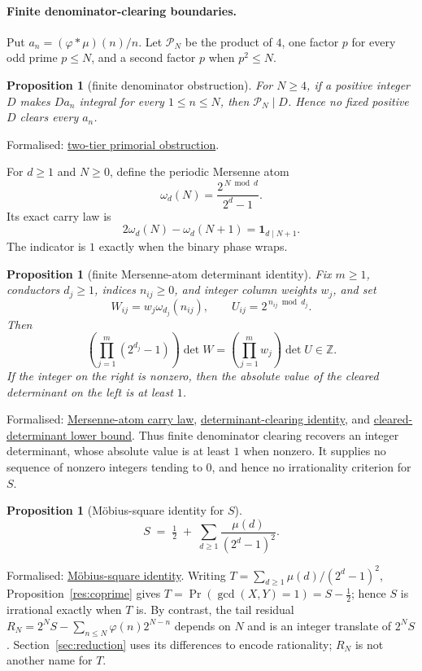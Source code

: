 \documentclass[11pt]{article}
\newcommand{\commit}{ebc98ee71f6819bd9fe344a0bb343542c604e533}
\newcommand{\repobase}{https://github.com/wcook04/plectis-lean-erdos249-257/blob/\commit}
\newcommand{\PK}{Erdos249257}
\newcommand{\lword}[4]{\href{\repobase/\PK/#1\#L#2}{#4}}
\newtheorem{proposition}[theorem]{Proposition}
\theoremstyle{definition}
\theoremstyle{remark}
\newcommand{\Z}{\mathbb{Z}}
\newcommand{\ph}{\varphi}
\begin{document}
{\paragraph{Finite denominator-clearing boundaries.}\label{sec:primitiveindex}
Put \(a_n=(\ph*\mu)(n)/n\).  Let $\mathcal P_N$ be the product of $4$, one factor
$p$ for every odd prime $p\le N$, and a second factor $p$ when $p^2\le N$.
\begin{proposition}[finite denominator obstruction]
\label{res:primitiveindex}
For $N\ge4$, if a positive integer $D$ makes $Da_n$ integral for every
$1\le n\le N$, then $\mathcal P_N\mid D$.  Hence no fixed positive $D$ clears every
$a_n$.
\end{proposition}
\noindent Formalised:
\lword{PrimitiveDeterminantLift.lean}{148}{twoTierPrimorial_dvd_of_integral_jet}{two-tier primorial obstruction}.

For \(d\ge1\) and $N\ge0$, define the periodic Mersenne atom
\[
 \omega_d(N)=\frac{2^{\,N\bmod d}}{2^d-1}.
\]
Its exact carry law is
\[
 2\omega_d(N)-\omega_d(N+1)=\mathbf1_{d\mid N+1}.
\]
The indicator is \(1\) exactly when the binary phase wraps.

\begin{proposition}[finite Mersenne-atom determinant identity]
\label{res:mersennetailatoms}
Fix \(m\ge1\), conductors \(d_j\ge1\), indices \(n_{ij}\ge0\), and integer
column weights \(w_j\), and set
\[
 W_{ij}=w_j\omega_{d_j}(n_{ij}),
 \qquad U_{ij}=2^{\,n_{ij}\bmod d_j}.
\]
Then
\[
 \left(\prod_{j=1}^m(2^{d_j}-1)\right)\det W
 =\left(\prod_{j=1}^m w_j\right)\det U\in\Z.
\]
If the integer on the right is nonzero, then the absolute value of the
cleared determinant on the left is at least \(1\).
\end{proposition}
\noindent Formalised:
\lword{MersenneTailAtoms.lean}{28}{mersenneTailAtom_step}{Mersenne-atom carry law},
\lword{MersenneTailAtoms.lean}{158}{weightedMersenneAtom_denominatorProduct_mul_det}{determinant-clearing identity},
and
\lword{MersenneTailAtoms.lean}{181}{one_le_abs_weightedMersenneAtom_cleared_det}{cleared-determinant lower bound}.
Thus finite denominator clearing recovers an integer determinant, whose
absolute value is at least $1$ when nonzero.  It supplies no sequence of
nonzero integers tending to $0$, and hence no irrationality criterion for \(S\).

\begin{proposition}[M\"obius-square identity for \(S\)]\label{res:lens}
\[
S \;=\; \tfrac12 \;+\; \sum_{d\ge1}\frac{\mu(d)}{(2^d-1)^2}.
\]
\end{proposition}
\noindent Formalised: \lword{CertificateKernel.lean}{18126}{totient_series_eq_half_add_moebius_mersenne_square}{M\"obius-square identity}.
Writing \(T=\sum_{d\ge1}\mu(d)/(2^d-1)^2\), Proposition~\ref{res:coprime}
gives \(T=\Pr(\gcd(X,Y)=1)=S-\tfrac12\); hence $S$ is irrational exactly
when $T$ is.  By contrast, the tail residual
\(R_N=2^NS-\sum_{n\le N}\ph(n)2^{N-n}\) depends on $N$ and is an integer
translate of $2^NS$.  Section~\ref{sec:reduction} uses its differences to
encode rationality; $R_N$ is not another name for $T$.

}
\end{document}
